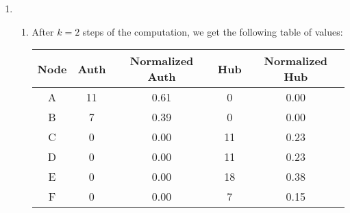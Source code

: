\documentclass{article}
\begin{document}
\begin{enumerate}
    \item \begin{enumerate}
        \item After $k=2$ steps of the computation, we get the following table of values:
        \begin{center}\begin{tabular}{||c | c | c | c | c||} 
            \hline
            Node & Auth & Normalized Auth & Hub & Normalized Hub \\ [0.5ex] 
            \hline\hline
            A & 11 & 0.61 & 0 & 0.00 \\
            \hline
            B & 7 & 0.39 & 0 & 0.00 \\
            \hline
            C & 0 & 0.00 & 11 & 0.23 \\
            \hline
            D & 0 & 0.00 & 11 & 0.23 \\
            \hline
            E & 0 & 0.00 & 18 & 0.38 \\
            \hline 
            F & 0 & 0.00 & 7 & 0.15 \\
            \hline
        \end{tabular}\end{center}
    \end{enumerate}
   

\end{enumerate}
\end{document}
